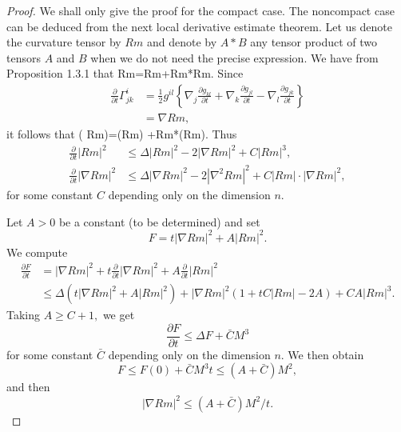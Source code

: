 \begin{proof}
We shall only give the proof for the compact case.  The noncompact
case can be deduced from the next local derivative estimate
theorem. Let us denote the curvature tensor by $Rm$ and denote by
$A*B$ any tensor product of two tensors $A$ and $B$ when we do not
need the precise expression. We have from Proposition 1.3.1 that
\be
{}Rm=\Delta Rm+Rm*Rm.  %
\ee Since
\begin{align*}
\frac{\partial}{\partial t}\Gamma^i_{jk} &  =
\frac{1}{2}g^{il}\left\{\nabla_j\frac{\partial g_{kl}}{\partial t}
+\nabla_k\frac{\partial g_{jl}}{\partial t}
-\nabla_l\frac{\partial g_{jk}}{\partial t}\right\}\\
&  = \nabla Rm ,
\end{align*}
it follows that \be {}(\nabla
Rm)=\Delta(\nabla Rm)
+Rm*(\nabla Rm).  %
\ee Thus
\begin{align*}
\frac{\partial}{\partial t}|Rm|^2
&\leq\Delta|Rm|^2-2|\nabla Rm|^2+C|Rm|^3,\\
\frac{\partial}{\partial t}|\nabla Rm|^2 &\leq\Delta|\nabla
Rm|^2-2|\nabla^2 Rm|^2+C|Rm|\cdot|\nabla Rm|^2,
\end{align*}
for some constant $C$ depending only on the dimension $n$.

Let $A>$0 be a constant (to be determined) and set
$$
F=t|\nabla Rm|^2+A|Rm|^2.
$$
We compute
\begin{align*}
\frac{\partial F}{\partial t} &  = |\nabla
Rm|^2+t\frac{\partial}{\partial t}|\nabla Rm|^2
+A\frac{\partial}{\partial t}|Rm|^2\\
& \leq \Delta(t|\nabla Rm|^2+A|Rm|^2)+|\nabla Rm|^2(1+tC|Rm|-2A)
+CA|Rm|^3.
\end{align*}
Taking $A\geq C+1,$ we get
$$
\frac{\partial F}{\partial t}\leq \Delta F+\bar{C}M^3
$$
for some constant $\bar{C}$ depending only on the dimension $n$.
We then obtain
$$
F\leq F(0)+\bar{C}M^3t\leq (A+\bar{C})M^2,
$$
and then
$$
|\nabla Rm|^2\leq(A+\bar{C})M^2/t.
$$


\end{proof}

